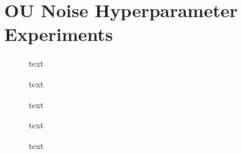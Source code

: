 \section{OU Noise Hyperparameter Experiments}

\begin{figure}[h]
	\centering
	
	\caption{text}
\end{figure}

\begin{figure}[h]
	\centering
	
	
	\caption{text}
	
	\vspace*{2cm}
	
	
	\caption{text}
\end{figure}

\begin{figure}[h]
	\centering

	
	\caption{text}
	
	\vspace*{2cm}
	
	
	\caption{text}
\end{figure}

